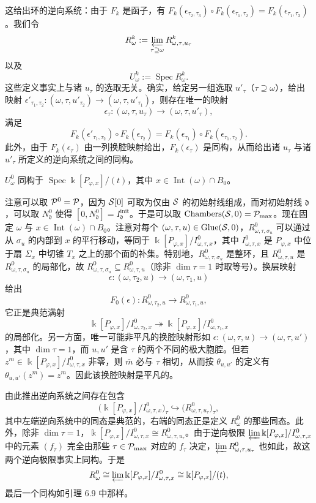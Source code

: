这给出环的逆向系统：由于 $F_k$ 是函子，有
$F_k(\epsilon_{\tau_2,\tau_3})\circ F_k(\epsilon_{\tau_1,\tau_2})=F_k(\epsilon_{\tau_1,\tau_3})$。我们令
\[
  R^k_\omega:=\varprojlim_{\tau\supseteq\omega}R^k_{\omega,\tau,u_\tau}
\]
以及
\[
  U^k_\omega:=\operatorname{Spec}R^k_\omega.
\]
这些定义事实上与诸 $u_\tau$ 的选取无关。确实，给定另一组选取 $u'_\tau$（$\tau\supseteq\omega$），给出映射
$\epsilon'_{\tau_1,\tau_2}:(\omega,\tau,u'_{\tau_2})\to(\omega,\tau,u'_{\tau_1})$，则存在唯一的映射
\[
  \epsilon_\tau:(\omega,\tau,u_\tau)\to(\omega,\tau,u'_\tau),
\]
满足
\[
  F_k(\epsilon'_{\tau_1,\tau_2})\circ F_k(\epsilon_{\tau_2})
  =F_k(\epsilon_{\tau_1})\circ F_k(\epsilon_{\tau_1,\tau_2}).
\]
此外，由于 $F_k(\epsilon_\tau)$ 由一列换腔映射给出，$F_k(\epsilon_\tau)$ 是同构，从而给出诸 $u_\tau$ 与诸 $u'_\tau$ 所定义的逆向系统之间的同构。

\begin{lemma}
$U^0_\omega$ 同构于 $\operatorname{Spec}\Bbbk[P_{\varphi,x}]/(t)$，其中 $x\in\operatorname{Int}(\omega)\cap B_0$。
\end{lemma}

注意可以取 $\mathcal{P}^0=\mathcal{P}$，因为 $\mathcal{S}[0]$ 可取为仅由 $\mathcal{S}$ 的初始射线组成，而对初始射线 $\mathfrak d$，可以取 $N^0_\mathfrak d$ 使得 $[0,N^0_\mathfrak d]=I^{\mathrm{init}}_\mathfrak d$。于是可以取 $\operatorname{Chambers}(\mathcal{S},0)=\mathcal{P}_{\max}$。现在固定 $\omega$ 与 $x\in\operatorname{Int}(\omega)\cap B_0$。注意对每个 $(\omega,\tau,u)\in\operatorname{Glue}(\mathcal{S},0)$，$R^0_{\omega,\tau,\sigma_u}$ 可以通过从 $\sigma_u$ 的内部到 $x$ 的平行移动，等同于 $\Bbbk[P_{\varphi,x}]/I^0_{\omega,\tau,x}$，其中 $I^0_{\omega,\tau,x}$ 是 $P_{\varphi,x}$ 中位于扇 $\Sigma_x$ 中切锥 $T_x$ 之上的那个面的补集。特别地，$R^0_{\omega,\tau,\sigma_u}$ 是整环，且 $R^0_{\omega,\tau,u}$ 是 $R^0_{\omega,\tau,\sigma_u}$ 的局部化，故 $R^0_{\omega,\tau,\sigma_u}\subseteq R^0_{\omega,\tau,u}$（除非 $\dim\tau=1$ 时取等号）。换层映射
\[
  \epsilon:(\omega,\tau_2,u)\to(\omega,\tau_1,u)
\]
给出
\[
  F_0(\epsilon):R^0_{\omega,\tau_2,u}\to R^0_{\omega,\tau_1,u},
\]
它正是典范满射
\[
  \Bbbk[P_{\varphi,x}]/I^0_{\omega,\tau_2,x}
  \twoheadrightarrow\Bbbk[P_{\varphi,x}]/I^0_{\omega,\tau_1,x}
\]
的局部化。另一方面，唯一可能非平凡的换腔映射形如 $\epsilon:(\omega,\tau,u)\to(\omega,\tau,u')$，其中 $\dim\tau=1$，而 $u,u'$ 是含 $\tau$ 的两个不同的极大胞腔。但若 $z^m\in\Bbbk[P_{\varphi,x}]/I^0_{\omega,\tau,x}$ 非零，则 $\bar m$ 必与 $\tau$ 相切，从而按 $\theta_{u,u'}$ 的定义有 $\theta_{u,u'}(z^m)=z^m$。因此该换腔映射是平凡的。

由此推出逆向系统之间存在包含
\[
  \bigl(\Bbbk[P_{\varphi,x}]/I^0_{\omega,\tau,x}\bigr)_\tau
  \hookrightarrow\bigl(R^0_{\omega,\tau,u_\tau}\bigr)_\tau,
\]
其中左端逆向系统中的同态是典范的，右端的同态正是定义 $R^0_\omega$ 的那些同态。此外，除非 $\dim\tau=1$，$\Bbbk[P_{\varphi,x}]/I^0_{\omega,\tau,x}\cong R^0_{\omega,\tau,u_\tau}$。由于逆向极限 $\varprojlim\Bbbk[P_{\varphi,x}]/I^0_{\omega,\tau,x}$ 中的元素 $(f_\tau)$ 完全由那些 $\tau\in\mathcal{P}_{\max}$ 对应的 $f_\tau$ 决定，$\varprojlim R^0_{\omega,\tau,u_\tau}$ 也如此，故这两个逆向极限事实上同构。于是
\[
  R^0_\omega\cong\varprojlim\Bbbk[P_{\varphi,x}]/I^0_{\omega,\tau,x}
  \cong\Bbbk[P_{\varphi,x}]/(t),
\]
最后一个同构如引理 6.9 中那样。

